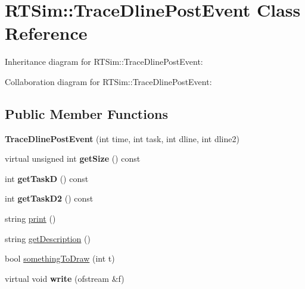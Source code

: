 \hypertarget{classRTSim_1_1TraceDlinePostEvent}{}\section{R\+T\+Sim\+:\+:Trace\+Dline\+Post\+Event Class Reference}
\label{classRTSim_1_1TraceDlinePostEvent}


Inheritance diagram for R\+T\+Sim\+:\+:Trace\+Dline\+Post\+Event\+:


Collaboration diagram for R\+T\+Sim\+:\+:Trace\+Dline\+Post\+Event\+:
\subsection*{Public Member Functions}
\begin{DoxyCompactItemize}
\item 
{\bfseries Trace\+Dline\+Post\+Event} (int time, int task, int dline, int dline2)\hypertarget{classRTSim_1_1TraceDlinePostEvent_a8fca002a46e836388e2919c19294d501}{}\label{classRTSim_1_1TraceDlinePostEvent_a8fca002a46e836388e2919c19294d501}

\item 
virtual unsigned int {\bfseries get\+Size} () const \hypertarget{classRTSim_1_1TraceDlinePostEvent_a66a9ee1cb099dfd14086ce8ac4dbcd2c}{}\label{classRTSim_1_1TraceDlinePostEvent_a66a9ee1cb099dfd14086ce8ac4dbcd2c}

\item 
int {\bfseries get\+TaskD} () const \hypertarget{classRTSim_1_1TraceDlinePostEvent_a9ecfc2adf85b98d3a42bf313f60fd61c}{}\label{classRTSim_1_1TraceDlinePostEvent_a9ecfc2adf85b98d3a42bf313f60fd61c}

\item 
int {\bfseries get\+Task\+D2} () const \hypertarget{classRTSim_1_1TraceDlinePostEvent_a9e8fe4a4e45a299725e623f7ecbd8523}{}\label{classRTSim_1_1TraceDlinePostEvent_a9e8fe4a4e45a299725e623f7ecbd8523}

\item 
string \hyperlink{classRTSim_1_1TraceDlinePostEvent_ac3e958d55191b191a54ccf914e864f23}{print} ()
\item 
string \hyperlink{classRTSim_1_1TraceDlinePostEvent_a64757e378a88739e77a7548b61e2d2f3}{get\+Description} ()
\item 
bool \hyperlink{classRTSim_1_1TraceDlinePostEvent_a2fcd6c87305879a98bc10e4ff248ca25}{something\+To\+Draw} (int t)
\item 
virtual void {\bfseries write} (ofstream \&f)\hypertarget{classRTSim_1_1TraceDlinePostEvent_a89439c69447b830abd49d97bcbc26e3f}{}\label{classRTSim_1_1TraceDlinePostEvent_a89439c69447b830abd49d97bcbc26e3f}


\end{DoxyCompactItemize}
